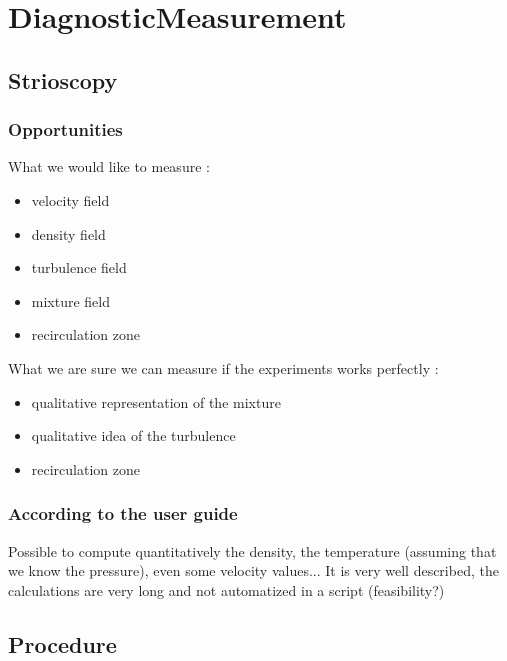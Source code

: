 \renewcommand\evenpagerightmark{{\scshape\small Diagnostic}}
\chapter[Diagnostic and Methods]%
{DiagnosticMeasurement}
\label{diagnostic_chapt}

\section{Strioscopy}

\subsection{Opportunities}

What we would like to measure :

\begin{itemize}
\item velocity field
\item density field
\item turbulence field
\item mixture field
\item recirculation zone
\end{itemize}

What we are sure we can measure if the experiments works perfectly  :

\begin{itemize}
\item qualitative representation of the mixture
\item qualitative idea of the turbulence 
\item recirculation zone
\end{itemize}



\subsection{According to the user guide}

Possible to compute quantitatively the density, the temperature (assuming that we know the pressure), even some velocity values... It is very well described, the calculations are very long and not automatized in a script (feasibility?)

\section{Procedure}

